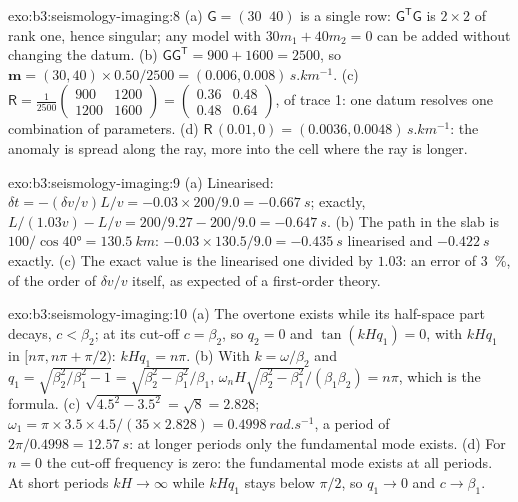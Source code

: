 \begin{solution}{exo:b3:seismology-imaging:8}
(a) $\mathsf G = (30\;\;40)$ is a single row: $\mathsf G^{\mathsf T}\mathsf G$ is
$2\times2$ of rank one, hence singular; any model with $30m_1 + 40m_2 = 0$ can
be added without changing the datum. (b) $\mathsf G\mathsf G^{\mathsf T} =
900 + 1600 = 2500$, so $\mathbf m = (30, 40)\times0.50/2500 =
(0.006, 0.008)\,\unit{s.km^{-1}}$. (c) $\mathsf R = \frac{1}{2500}
\begin{pmatrix} 900 & 1200 \\ 1200 & 1600 \end{pmatrix} =
\begin{pmatrix} 0.36 & 0.48 \\ 0.48 & 0.64 \end{pmatrix}$, of trace 1: one
datum resolves one combination of parameters. (d) $\mathsf R\,(0.01, 0) =
(0.0036, 0.0048)\,\unit{s.km^{-1}}$: the anomaly is spread along the ray, more
into the cell where the ray is longer.
\end{solution}

\begin{solution}{exo:b3:seismology-imaging:9}
(a) Linearised: $\delta t = -(\delta v/v)L/v = -0.03\times200/9.0 =
\qty{-0.667}{s}$; exactly, $L/(1.03v) - L/v = 200/9.27 - 200/9.0 =
\qty{-0.647}{s}$. (b) The path in the slab is $100/\cos\ang{40} =
\qty{130.5}{km}$: $-0.03\times130.5/9.0 = \qty{-0.435}{s}$ linearised and
$\qty{-0.422}{s}$ exactly. (c) The exact value is the linearised one divided by
$1.03$: an error of \qty{3}{\percent}, of the order of $\delta v/v$ itself, as
expected of a first-order theory.
\end{solution}

\begin{solution}{exo:b3:seismology-imaging:10}
(a) The overtone exists while its half-space part decays, $c < \beta_2$; at its
cut-off $c = \beta_2$, so $q_2 = 0$ and $\tan(kHq_1) = 0$, with $kHq_1$ in
$[n\pi, n\pi + \pi/2)$: $kHq_1 = n\pi$. (b) With $k = \omega/\beta_2$ and
$q_1 = \sqrt{\beta_2^2/\beta_1^2 - 1} = \sqrt{\beta_2^2 - \beta_1^2}/\beta_1$,
$\omega_nH\sqrt{\beta_2^2 - \beta_1^2}/(\beta_1\beta_2) = n\pi$, which is the
formula. (c) $\sqrt{4.5^2 - 3.5^2} = \sqrt8 = 2.828$; $\omega_1 =
\pi\times3.5\times4.5/(35\times2.828) = \qty{0.4998}{rad.s^{-1}}$, a period of
$2\pi/0.4998 = \qty{12.57}{s}$: at longer periods only the fundamental mode
exists. (d) For $n = 0$ the cut-off frequency is zero: the fundamental mode
exists at all periods. At short periods $kH \to \infty$ while $kHq_1$ stays
below $\pi/2$, so $q_1 \to 0$ and $c \to \beta_1$.
\end{solution}

